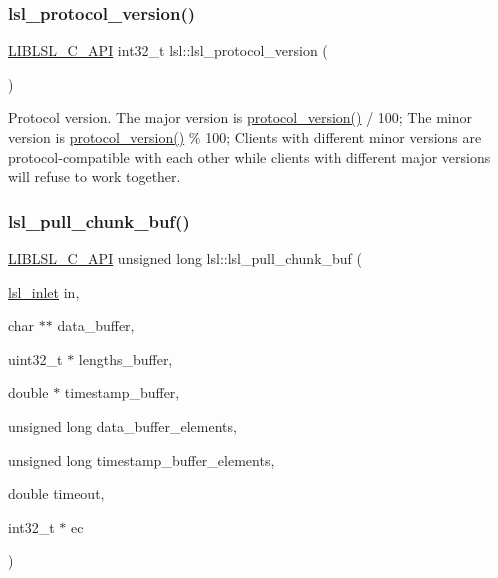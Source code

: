 \subsubsection{\texorpdfstring{lsl\+\_\+protocol\+\_\+version()}{lsl\_protocol\_version()}}
{\footnotesize\ttfamily \hyperlink{lsl__cpp_8h_aafd0ef1813e8be84a1420c4f1df64615}{L\+I\+B\+L\+S\+L\+\_\+\+C\+\_\+\+A\+PI} int32\+\_\+t lsl\+::lsl\+\_\+protocol\+\_\+version (\begin{DoxyParamCaption}{ }\end{DoxyParamCaption})}

Protocol version. The major version is \hyperlink{namespacelsl_a59009e83a8f0e33643474b373ad2f7f2}{protocol\+\_\+version()} / 100; The minor version is \hyperlink{namespacelsl_a59009e83a8f0e33643474b373ad2f7f2}{protocol\+\_\+version()} \% 100; Clients with different minor versions are protocol-\/compatible with each other while clients with different major versions will refuse to work together. \mbox{\label{namespacelsl_a90d24057f9ba37f33d3539666af27082}} 
\subsubsection{\texorpdfstring{lsl\+\_\+pull\+\_\+chunk\+\_\+buf()}{lsl\_pull\_chunk\_buf()}}
{\footnotesize\ttfamily \hyperlink{lsl__cpp_8h_aafd0ef1813e8be84a1420c4f1df64615}{L\+I\+B\+L\+S\+L\+\_\+\+C\+\_\+\+A\+PI} unsigned long lsl\+::lsl\+\_\+pull\+\_\+chunk\+\_\+buf (\begin{DoxyParamCaption}\item[{\hyperlink{namespacelsl_a884a3363cfcba75d7ce8f00c1c4c54f1}{lsl\+\_\+inlet}}]{in,  }\item[{char $\ast$$\ast$}]{data\+\_\+buffer,  }\item[{uint32\+\_\+t $\ast$}]{lengths\+\_\+buffer,  }\item[{double $\ast$}]{timestamp\+\_\+buffer,  }\item[{unsigned long}]{data\+\_\+buffer\+\_\+elements,  }\item[{unsigned long}]{timestamp\+\_\+buffer\+\_\+elements,  }\item[{double}]{timeout,  }\item[{int32\+\_\+t $\ast$}]{ec }\end{DoxyParamCaption})}

